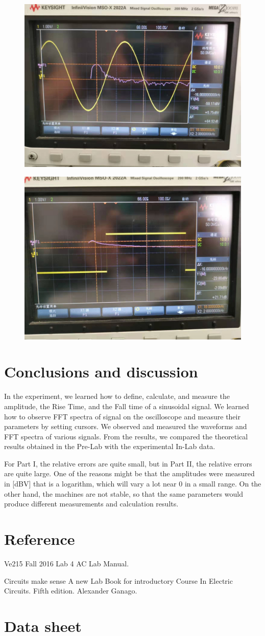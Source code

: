 \documentclass[a4paper]{report}
\begin{document}
\begin{figure}[H]
	\centering
	\includegraphics[width=0.8\linewidth]{10.jpg}
\end{figure}
\begin{figure}[H]
	\centering
	\includegraphics[width=0.8\linewidth]{11.jpg}
\end{figure}
\section{Conclusions and discussion}
In the experiment, we learned how to define, calculate, and measure the amplitude, the Rise Time, and the Fall time of a sinusoidal signal. We learned how to observe FFT spectra of signal on the oscilloscope and measure their parameters by setting cursors. We observed and measured the waveforms and FFT spectra of various signals. From the results, we compared the theoretical results obtained in the Pre-Lab with the experimental In-Lab data.

For Part I, the relative errors are quite small, but in Part II, the relative errors are quite large. One of the reasons might be that the amplitudes were measured in [dBV] that is a logarithm, which will vary a lot near 0 in a small range. On the other hand, the machines are not stable, so that the same parameters would produce different measurements and calculation results.
\section*{Reference}
\begin{hangparas}{2em}{1}
Ve215 Fall 2016 Lab 4 AC Lab Manual.

Circuits make sense A new Lab Book for introductory Course In Electric Circuits. Fifth edition. Alexander Ganago.
\end{hangparas}
\vspace{17cm}
\section*{Data sheet}
\end{document}
